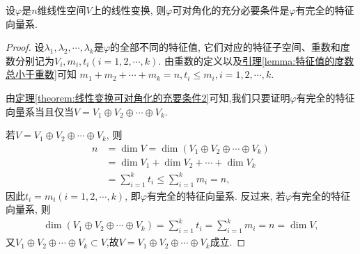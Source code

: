 \documentclass[../../main.tex]{subfiles}%
\begin{document}
\begin{theorem}[线性变换可对角化的充要条件]\label{theorem:线性变换可对角化的充要条件3}
设$\varphi$是$n$维线性空间$V$上的线性变换, 则$\varphi$可对角化的充分必要条件是$\varphi$有完全的特征向量系.
\end{theorem}
\begin{proof}

设$\lambda_1, \lambda_2, \cdots, \lambda_k$是$\varphi$的全部不同的特征值, 它们对应的特征子空间、重数和度数分别记为$V_i, m_i, t_i (i = 1, 2, \cdots, k)$. 由重数的定义以及\hyperref[lemma:特征值的度数总小于重数]{引理\ref{lemma:特征值的度数总小于重数}}可知
$m_1 + m_2 + \cdots + m_k = n, t_i \leqslant  m_i, i = 1, 2, \cdots, k$.

由\hyperref[theorem:线性变换可对角化的充要条件2]{定理\ref{theorem:线性变换可对角化的充要条件2}}可知,我们只要证明$\varphi$有完全的特征向量系当且仅当$V = V_1 \oplus V_2 \oplus \cdots \oplus V_k$.

若$V = V_1 \oplus V_2 \oplus \cdots \oplus V_k$, 则
\begin{align*}
n &= \dim V = \dim(V_1 \oplus V_2 \oplus \cdots \oplus V_k) \\
&= \dim V_1 + \dim V_2 + \cdots + \dim V_k \\
&= \sum_{i=1}^{k} t_i \leqslant  \sum_{i=1}^{k} m_i = n,
\end{align*}
因此$t_i = m_i (i = 1, 2, \cdots, k)$, 即$\varphi$有完全的特征向量系. 反过来, 若$\varphi$有完全的特征向量系, 则
\begin{align*}
\dim(V_1 \oplus V_2 \oplus \cdots \oplus V_k) = \sum_{i=1}^{k} t_i = \sum_{i=1}^{k} m_i = n = \dim V,
\end{align*}
又$V_1\oplus V_2\oplus \cdots \oplus V_k\subset V$,故$V = V_1 \oplus V_2 \oplus \cdots \oplus V_k$成立.

\end{proof}
\end{document}
